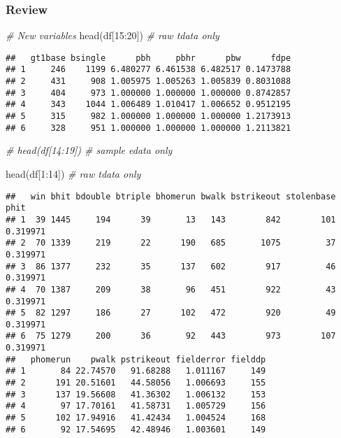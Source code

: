 \documentclass[
]{article}
\newenvironment{Shaded}{\begin{snugshade}}{\end{snugshade}}
\newcommand{\CommentTok}[1]{\textcolor[rgb]{0.56,0.35,0.01}{\textit{#1}}}
\newcommand{\DecValTok}[1]{\textcolor[rgb]{0.00,0.00,0.81}{#1}}
\newcommand{\FunctionTok}[1]{\textcolor[rgb]{0.00,0.00,0.00}{#1}}
\newcommand{\NormalTok}[1]{#1}
\newcommand{\SpecialCharTok}[1]{\textcolor[rgb]{0.00,0.00,0.00}{#1}}
\begin{document}
\hypertarget{review}{%
\subsubsection{Review}\label{review}}

\begin{Shaded}
\begin{Highlighting}[]
\CommentTok{\# New variables}
\FunctionTok{head}\NormalTok{(df[}\DecValTok{15}\SpecialCharTok{:}\DecValTok{20}\NormalTok{]) }\CommentTok{\# raw tdata only}
\end{Highlighting}
\end{Shaded}

\begin{verbatim}
##   gt1base bsingle      pbh     pbhr      pbw      fdpe
## 1     246    1199 6.480277 6.461538 6.482517 0.1473788
## 2     431     908 1.005975 1.005263 1.005839 0.8031088
## 3     404     973 1.000000 1.000000 1.000000 0.8742857
## 4     343    1044 1.006489 1.010417 1.006652 0.9512195
## 5     315     982 1.000000 1.000000 1.000000 1.2173913
## 6     328     951 1.000000 1.000000 1.000000 1.2113821
\end{verbatim}

\begin{Shaded}
\begin{Highlighting}[]
\CommentTok{\# head(df[14:19]) \# sample edata only}
\end{Highlighting}
\end{Shaded}

\begin{Shaded}
\begin{Highlighting}[]
\FunctionTok{head}\NormalTok{(df[}\DecValTok{1}\SpecialCharTok{:}\DecValTok{14}\NormalTok{]) }\CommentTok{\# raw tdata only}
\end{Highlighting}
\end{Shaded}

\begin{verbatim}
##   win bhit bdouble btriple bhomerun bwalk bstrikeout stolenbase     phit
## 1  39 1445     194      39       13   143        842        101 0.319971
## 2  70 1339     219      22      190   685       1075         37 0.319971
## 3  86 1377     232      35      137   602        917         46 0.319971
## 4  70 1387     209      38       96   451        922         43 0.319971
## 5  82 1297     186      27      102   472        920         49 0.319971
## 6  75 1279     200      36       92   443        973        107 0.319971
##   phomerun    pwalk pstrikeout fielderror fielddp
## 1       84 22.74570   91.68288   1.011167     149
## 2      191 20.51601   44.58056   1.006693     155
## 3      137 19.56608   41.36302   1.006132     153
## 4       97 17.70161   41.58731   1.005729     156
## 5      102 17.94916   41.42434   1.004524     168
## 6       92 17.54695   42.48946   1.003601     149
\end{verbatim}
\end{document}
